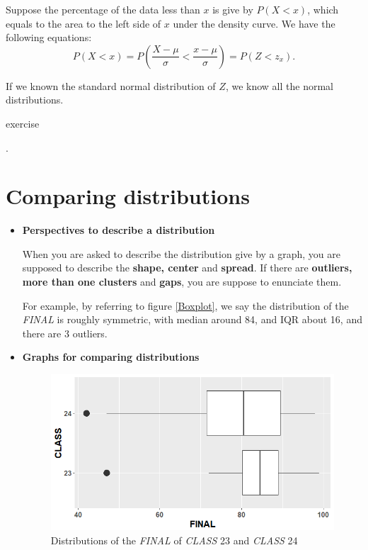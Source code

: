 \documentclass[a4paper, 12pt,twoside]{book}
\begin{document}
\begin{itemize}
Suppose the percentage of the data less than $x$ is give by $P(X<x)$, which equals to the area to the left side of $x$ under the density curve. We have the following equations:
$$P(X<x)= P(\frac{X-\mu}{\sigma}<\frac{x-\mu}{\sigma}) = P(Z<z_x).$$

\colorbox{babypink}{\parbox{15.2cm}{If we known the standard normal distribution of $Z$, we know all the normal distributions.}}

\colorbox{dollarbill}{\parbox{15.2cm}{exercise}}.
\end{itemize}



\section{Comparing distributions}
\begin{itemize}
\item \textbf{Perspectives to describe a distribution}

When you are asked to describe the distribution give by a graph, you are supposed to describe the \textbf{shape, center} and \textbf{spread}. If there are \textbf{outliers, more than one clusters} and \textbf{gaps}, you are suppose to enunciate them.
\vspace{0.6cm}

For example, by referring to figure \ref{Boxplot}, we say the distribution of the \textit{FINAL} is roughly symmetric, with median around 84, and IQR about 16, and there are 3 outliers.

\item \textbf{Graphs for comparing distributions}

\begin{figure}[H]
\centering
\includegraphics[scale=0.5]{BxoplotComparison.png}
\caption{Distributions of the \textit{FINAL} of \textit{CLASS} 23 and \textit{CLASS} 24}
\label{BxoplotComparison}
\end{figure}


\end{itemize}
\end{document}
